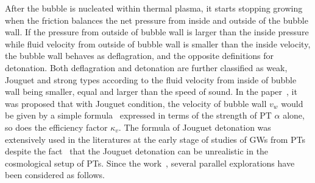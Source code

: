 \documentclass[a4paper,11pt]{article}
\begin{document}
After the bubble is nucleated within thermal plasma, it starts stopping growing when the friction balances the net pressure from inside and outside of the bubble wall. If the pressure from outside of bubble wall is larger than the inside pressure while fluid velocity from outside of bubble wall is smaller than the inside velocity, the bubble wall behaves as deflagration, and the opposite definitions for detonation. Both deflagration and detonation are further classified as weak, Jouguet and strong types according to the fluid velocity from inside of bubble wall being smaller, equal and larger than the speed of sound. In the  paper~\cite{Steinhardt:1981ct}, it was proposed that with Jouguet condition, the velocity of bubble wall $v_w$ would be given by a simple formula~\cite{Steinhardt:1981ct} expressed in terms of the strength of PT $\alpha$ alone, so does the efficiency factor $\kappa_v$. The formula of Jouguet detonation was extensively used in the literatures at the early stage of studies of GWs from PTs despite the fact~\cite{KurkiSuonio:1995pp} that the Jouguet detonation can be unrealistic in the cosmological setup of PTs. Since the work~\cite{KurkiSuonio:1995pp}, several parallel explorations have been considered as follows.
\end{document}

